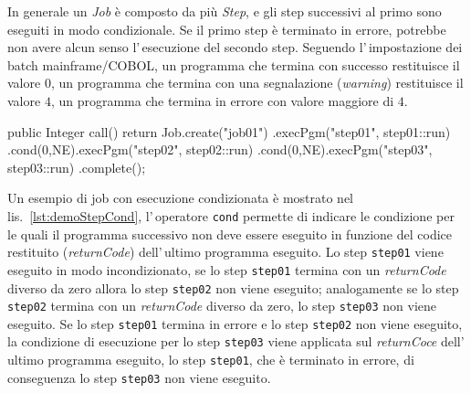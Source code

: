 In generale un \textit{Job} è composto da più \textit{Step}, e gli step
successivi al primo sono eseguiti in modo condizionale.
Se il primo step è terminato in errore, potrebbe non avere alcun senso
l'\,esecuzione del secondo step.
Seguendo l'\,impostazione dei batch mainframe/COBOL, un programma che termina
con successo restituisce il valore $0$, un programma che termina con una
segnalazione (\textit{warning}) restituisce il valore $4$, un programma che
termina in errore con valore maggiore di $4$.


\begin{elisting}[!htb]
\begin{javacode}
public Integer call() {
    return Job.create("job01")
        .execPgm("step01", step01::run)
        .cond(0,NE).execPgm("step02", step02::run)
        .cond(0,NE).execPgm("step03", step03::run)
        .complete();
}
\end{javacode}
\caption{Esempio di job con step condizionali}
\label{lst:demoStepCond}
\end{elisting}
Un esempio di job con esecuzione condizionata è mostrato nel
lis.~\ref{lst:demoStepCond}, l'\,operatore \texttt{cond} permette di indicare
le condizione per le quali il programma successivo non deve essere eseguito in
funzione del codice restituito (\textit{returnCode}) dell'\,ultimo programma
eseguito.
Lo step \texttt{step01} viene eseguito in modo incondizionato, se lo step
\texttt{step01} termina con un \textit{returnCode} diverso da zero allora lo
step \texttt{step02} non viene eseguito; analogamente se lo step \texttt{step02}
termina con un \textit{returnCode} diverso da zero, lo step \texttt{step03} non
viene eseguito.
Se lo step \texttt{step01} termina in errore e lo step \texttt{step02} non viene
eseguito, la condizione di esecuzione per lo step \texttt{step03} viene
applicata sul \textit{returnCoce} dell'\,ultimo programma eseguito, lo step
\texttt{step01}, che è terminato in errore, di conseguenza lo step
\texttt{step03} non viene eseguito.


